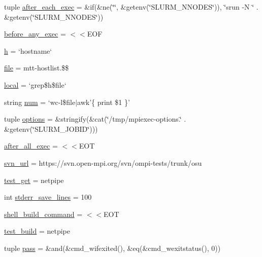 \begin{DoxyCompactItemize}
\item 
tuple \hyperlink{namespaceompi-core-perf-testing_ab2e32038b326d667da911a49949a9895}{after\-\_\-each\-\_\-exec} = \&if(\&ne(\char`\"{}\char`\"{}, \&getenv(\char`\"{}S\-L\-U\-R\-M\-\_\-\-N\-N\-O\-D\-E\-S\char`\"{})), \char`\"{}srun -\/N \char`\"{} . \&getenv(\char`\"{}S\-L\-U\-R\-M\-\_\-\-N\-N\-O\-D\-E\-S\char`\"{}))
\item 
\hyperlink{namespaceompi-core-perf-testing_a9a129769c3562f66e1c8657a148858b6}{before\-\_\-any\-\_\-exec} = $<$$<$E\-O\-F
\item 
\hyperlink{namespaceompi-core-perf-testing_a288ab27bb997a5db5f291de283963be0}{h} = `hostname`
\item 
\hyperlink{namespaceompi-core-perf-testing_ad75cfc8b0adfe42041110d8fcf748e79}{file} = mtt-\/hostlist.\$\$
\item 
\hyperlink{namespaceompi-core-perf-testing_a4a086e4123b85a46d9c48273cca50851}{local} = `grep\$h\$file`
\item 
string \hyperlink{namespaceompi-core-perf-testing_acd38c99cb54f2722bedc9c1103afeee9}{num} = `wc-\/l\$file$\vert$awk'\{ print \$1 \}'
\item 
tuple \hyperlink{namespaceompi-core-perf-testing_a760d2751fa8a987c662b192792d0e6f2}{options} = \&stringify(\&cat(\char`\"{}/tmp/mpiexec-\/options.\char`\"{} . \&getenv(\char`\"{}S\-L\-U\-R\-M\-\_\-\-J\-O\-B\-I\-D\char`\"{})))
\item 
\hyperlink{namespaceompi-core-perf-testing_ac417c6de85c14980c8e81a9bb5888325}{after\-\_\-all\-\_\-exec} = $<$$<$E\-O\-T
\item 
\hyperlink{namespaceompi-core-perf-testing_a886629d41ede129accbc04e99dc7b110}{svn\-\_\-url} = https\-://svn.\-open-\/mpi.\-org/svn/ompi-\/tests/trunk/osu
\item 
\hyperlink{namespaceompi-core-perf-testing_a725e3158d8ea5ff2ed5a27ad764902fe}{test\-\_\-get} = netpipe
\item 
int \hyperlink{namespaceompi-core-perf-testing_a6be1f4c75e49b8955241e24d4e26ed03}{stderr\-\_\-save\-\_\-lines} = 100
\item 
\hyperlink{namespaceompi-core-perf-testing_a0bd18f93397d6a31113bad591de7ada2}{shell\-\_\-build\-\_\-command} = $<$$<$E\-O\-T
\item 
\hyperlink{namespaceompi-core-perf-testing_a84f687adcf3641ad705d066e5e141f8f}{test\-\_\-build} = netpipe
\item 
tuple \hyperlink{namespaceompi-core-perf-testing_a63aea59e5b483f2e47c3b25d6fb6e162}{pass} = \&and(\&cmd\-\_\-wifexited(), \&eq(\&cmd\-\_\-wexitstatus(), 0))
$$
\end{DoxyCompactItemize}
